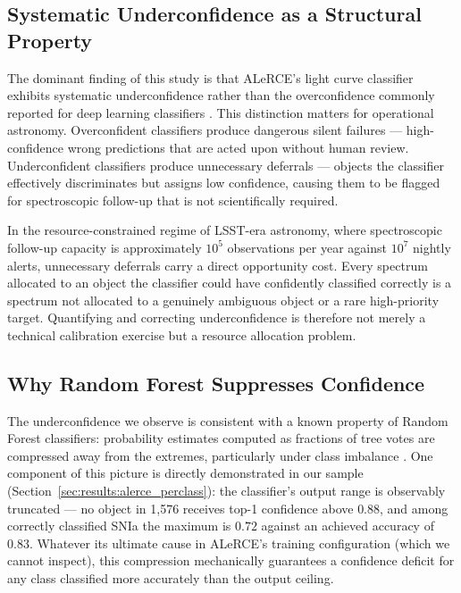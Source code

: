 \subsection{Systematic Underconfidence as a Structural Property}
\label{sec:discussion:underconfidence}

The dominant finding of this study is that ALeRCE's light curve 
classifier exhibits systematic underconfidence rather than the 
overconfidence commonly reported for deep learning classifiers 
\citep{Guo2017, Minderer2021}. This distinction matters for 
operational astronomy. Overconfident classifiers produce dangerous 
silent failures — high-confidence wrong predictions that are acted 
upon without human review. Underconfident classifiers produce 
unnecessary deferrals — objects the classifier effectively 
discriminates but assigns low confidence, causing them to be 
flagged for spectroscopic follow-up that is not scientifically 
required.

In the resource-constrained regime of LSST-era astronomy, where 
spectroscopic follow-up capacity is approximately $10^5$ 
observations per year against $10^7$ nightly alerts, unnecessary 
deferrals carry a direct opportunity cost. Every spectrum allocated 
to an object the classifier could have confidently classified 
correctly is a spectrum not allocated to a genuinely ambiguous 
object or a rare high-priority target. Quantifying and correcting 
underconfidence is therefore not merely a technical calibration 
exercise but a resource allocation problem.

\subsection{Why Random Forest Suppresses Confidence}
\label{sec:discussion:rf}

The underconfidence we observe is consistent with a known property
of Random Forest classifiers: probability estimates computed as
fractions of tree votes are compressed away from the extremes,
particularly under class imbalance
\citep{Niculescu-Mizil2005, Zadrozny2002}. One component of this
picture is directly demonstrated in our sample
(Section~\ref{sec:results:alerce_perclass}): the classifier's output
range is observably truncated — no object in 1,576 receives top-1
confidence above $0.88$, and among correctly classified SNIa the
maximum is $0.72$ against an achieved accuracy of $0.83$. Whatever
its ultimate cause in ALeRCE's training configuration (which we
cannot inspect), this compression mechanically guarantees a
confidence deficit for any class classified more accurately than the
output ceiling.

